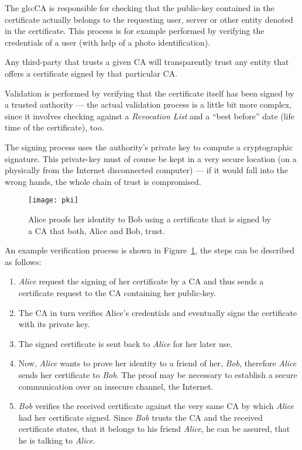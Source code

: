 The \gls{glo:CA} is responsible for checking that the public-key contained
in  the certificate  actually belongs  to the  requesting user,  server or
other  entity denoted  in the  certificate.  This  process is  for example
performed by verifying the credentials of a user (\eg with help of a photo
identification).

Any third-party that trusts a given CA will transparently trust any entity
that offers a certificate signed by that particular CA.

Validation is performed by verifying  that the certificate itself has been
signed  by a  trusted authority  --- the  actual validation  process  is a
little   bit  more  complex,   since  it   involves  checking   against  a
\emph{Revocation List} and  a ``best before'' date (\ie life  time of the
certificate), too.

The  signing  process  uses  the  authority's private  key  to  compute  a
cryptographic signature. This private-key must of course be kept in a very
secure  location  (\eg on a  physically  from  the Internet  disconnected
computer) ---  if it would fall into  the wrong hands, the  whole chain of
trust is compromised.

\begin{figure}[h]
  \centering
  \texttt{[image: pki]}
  \caption[Public  Key Infrastructure]{Alice  proofs her  identity  to Bob
    using a certificate  that is signed by a CA that  both, Alice and Bob,
    trust.}
  \label{fig:pki}
\end{figure}

An  example verification  process  is shown  in Figure~\ref{fig:pki},  the
steps can be described as follows:
\begin{enumerate}
\item \emph{Alice} request the signing of her certificate by a CA and thus
  sends a certificate request to the CA containing her public-key.
\item The CA in turn verifies Alice's credentials and eventually signs the
  certificate with its private key.
\item The signed certificate is sent back to \emph{Alice} for her later use.
\item Now,  \emph{Alice} wants to prove  her identity to a  friend of her,
  \emph{Bob},   therefore   \emph{Alice}    sends   her   certificate   to
  \emph{Bob}.  The   proof  may  be   necessary  to  establish   a  secure
  communication over an insecure channel, \eg the Internet.
\item \emph{Bob}  verifies the received certificate against  the very same
  CA by  which \emph{Alice} had her certificate  signed.  Since \emph{Bob}
  trusts the  CA and the received  certificate states, that  it belongs to
  his  friend \emph{Alice},  he  can be  assured,  that he  is talking  to
  \emph{Alice}.
\end{enumerate}

